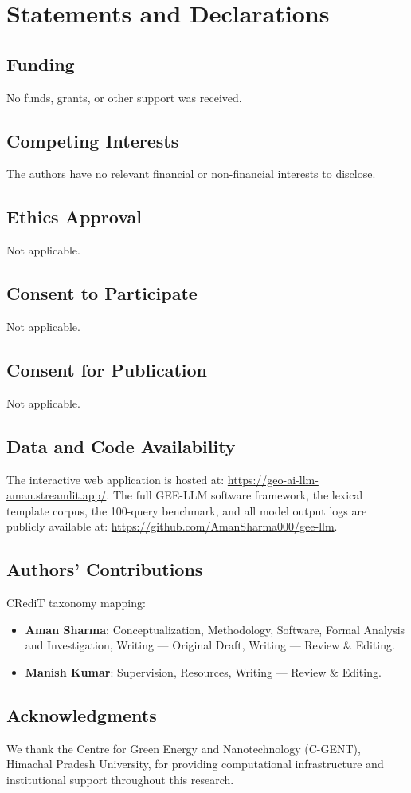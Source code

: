 \documentclass[pdflatex,sn-mathphys-ay]{sn-jnl}
\begin{document}
\section*{Statements and Declarations}

\subsection*{Funding}
No funds, grants, or other support was received.

\subsection*{Competing Interests}
The authors have no relevant financial or non-financial interests to disclose.

\subsection*{Ethics Approval}
Not applicable.

\subsection*{Consent to Participate}
Not applicable.

\subsection*{Consent for Publication}
Not applicable.

\subsection*{Data and Code Availability}
The interactive web application is hosted at: \url{https://geo-ai-llm-aman.streamlit.app/}. The full GEE-LLM software framework, the lexical template corpus, the 100-query benchmark, and all model output logs are publicly available at: \url{https://github.com/AmanSharma000/gee-llm}.

\subsection*{Authors' Contributions}
CRediT taxonomy mapping:
\begin{itemize}
    \item \textbf{Aman Sharma}: Conceptualization, Methodology, Software, Formal Analysis and Investigation, Writing --- Original Draft, Writing --- Review \& Editing.
    \item \textbf{Manish Kumar}: Supervision, Resources, Writing --- Review \& Editing.
\end{itemize}

\subsection*{Acknowledgments}
We thank the Centre for Green Energy and Nanotechnology (C-GENT), Himachal Pradesh University, for providing computational infrastructure and institutional support throughout this research.
\end{document}
